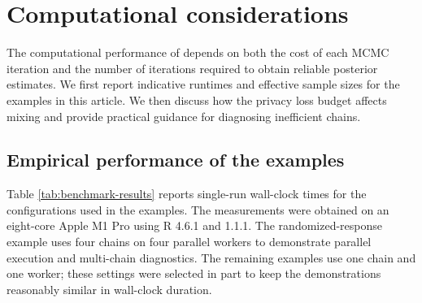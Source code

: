 \section{Computational considerations}\label{sec:computation}

The computational performance of  depends on both the cost of
each MCMC iteration and the number of iterations required to obtain reliable
posterior estimates. We first report indicative runtimes and effective sample
sizes for the examples in this article. We then discuss how the privacy loss
budget affects mixing and provide practical guidance for diagnosing inefficient
chains.

\subsection{Empirical performance of the examples}\label{sec:benchmarks}

Table \ref{tab:benchmark-results} reports single-run wall-clock times for the
configurations used in the examples. The measurements were obtained on an
eight-core Apple M1 Pro using R 4.6.1 \citep{R_core} and  1.1.1.
The randomized-response example uses
four chains on four parallel workers to demonstrate parallel execution and
multi-chain diagnostics. The remaining examples use one chain and one worker;
these settings were selected in part to keep the demonstrations reasonably
similar in wall-clock duration.

\begin{table}[!h]
\centering
\caption{\label{tab:benchmark-results}Indicative wall-clock runtimes and minimum bulk effective sample sizes for the article examples. Minimum bulk ESS is taken across the model parameters. Under the configurations shown, all four examples finish in under 70 seconds, but their minimum bulk effective sample sizes vary substantially.}
\centering
{}
\end{table}

